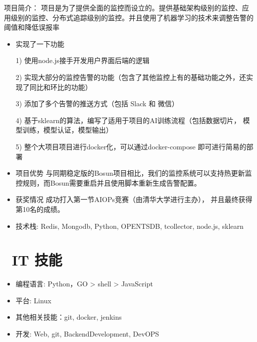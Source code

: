 \documentclass{resume}
\begin{document}
{
项目简介： 项目是为了提供全面的监控而设立的。提供基础架构级别的监控、应用级别的监控、分布式追踪级别的监控。并且使用了机器学习的技术来调整告警的阈值和降低误报率
\begin{onehalfspacing}
\begin{itemize}
  \item 实现了一下功能
  \item [1)]
     使用node.js接手开发用户界面后端的逻辑
  \item [2)]
     实现大部分的监控告警的功能（包含了其他监控上有的基础功能之外，还实现了同比和环比的功能）
  \item [3)]
     添加了多个告警的推送方式（包括 Slack 和 微信）
  \item [4)]
     基于sklearn的算法，编写了适用于项目的AI训练流程（包括数据切片， 模型训练，模型认证，模型输出）
  \item [5)]
     整个大项目项目进行docker化，可以通过docker-compose 即可进行简易的部署
  \item 项目优势
     与同期稳定版的Bosun项目相比，我们的监控系统可以支持热更新监控规则，而Bosun需要重启并且使用脚本重新生成告警配置。
  \item 获奖情况
     成功打入第一节AIOPs竞赛（由清华大学进行主办）， 并且最终获得第10名的成绩。
  \item 技术栈: Redis, Mongodb, Python, OPENTSDB, tcollector, node.js, sklearn
\end{itemize}
\end{onehalfspacing}


\section{\faCogs\ IT 技能}
\begin{itemize}[parsep=0.5ex]
  \item 编程语言: Python，GO > shell > JavaScript
  \item 平台: Linux
  \item 其他相关技能：git, docker, jenkins
  \item 开发: Web, git, BackendDevelopment, DevOPS
\end{itemize}

}
\end{document}
